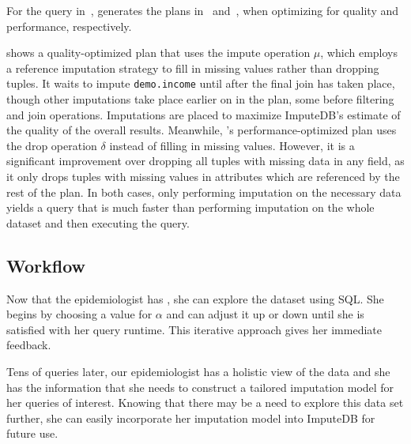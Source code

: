 For the query in~, \ProjectName{} generates
the plans in~ and~, when 
optimizing for quality and performance, respectively.

 shows a quality-optimized plan that uses the impute operation $\mu$,
which employs a reference imputation strategy to fill in missing values rather than dropping tuples.
It waits to impute \verb|demo.income| until after the final join has taken place, though other imputations take place earlier on in the plan, some before filtering and join operations.
Imputations are placed to maximize ImputeDB's estimate of the quality of the overall results.
Meanwhile, 's performance-optimized plan uses the drop operation $\delta$ instead of filling in missing values.
However, it is a significant improvement over dropping all tuples with missing data in any field, as it only drops tuples with missing values in attributes which are referenced by the rest of the plan. In both cases, only performing
imputation on the necessary data yields a query that is much faster
than performing imputation on the whole dataset and then executing
the query.

\subsection{\ProjectName{} Workflow}
Now that the epidemiologist has \ProjectName{}, she can explore
the dataset using SQL. She begins by choosing a value for $\alpha$ and can adjust it up or
down until she is satisfied with her query runtime. This iterative approach gives her 
immediate feedback.

Tens of queries later, our epidemiologist has a holistic view of the data and she has the information that she needs to construct a tailored imputation model for her queries of interest.
Knowing that there may be a need to explore this data set further, she can easily incorporate her imputation model into ImputeDB for future use.

%




